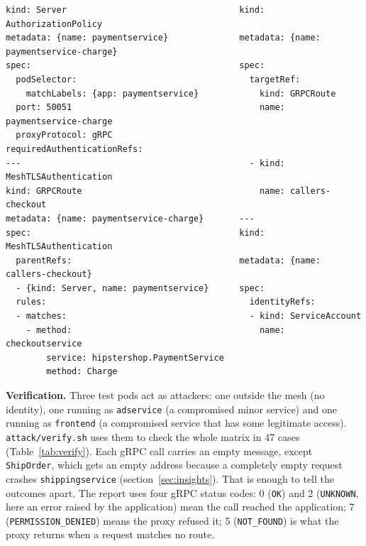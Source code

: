 \documentclass[12pt,a4paper]{article}
\begin{document}
\begin{listing}[H]
\begin{Verbatim}[fontsize=\footnotesize,frame=single,framesep=2mm]
kind: Server                                  kind: AuthorizationPolicy
metadata: {name: paymentservice}              metadata: {name: paymentservice-charge}
spec:                                         spec:
  podSelector:                                  targetRef:
    matchLabels: {app: paymentservice}            kind: GRPCRoute
  port: 50051                                     name: paymentservice-charge
  proxyProtocol: gRPC                           requiredAuthenticationRefs:
---                                             - kind: MeshTLSAuthentication
kind: GRPCRoute                                   name: callers-checkout
metadata: {name: paymentservice-charge}       ---
spec:                                         kind: MeshTLSAuthentication
  parentRefs:                                 metadata: {name: callers-checkout}
  - {kind: Server, name: paymentservice}      spec:
  rules:                                        identityRefs:
  - matches:                                    - kind: ServiceAccount
    - method:                                     name: checkoutservice
        service: hipstershop.PaymentService
        method: Charge
\end{Verbatim}
\caption{The four resources that let only \texttt{checkoutservice} call
  \texttt{PaymentService/Charge}, shortened (no \texttt{apiVersion},
  namespace or labels). The same file has a second route and policy for the
  health check. Full version: \texttt{policies/paymentservice.yaml} and
  \texttt{policies/00-authentications.yaml}.}
\label{lst:payment}
\end{listing}

\textbf{Verification.} Three test pods act as attackers: one outside the mesh
(no identity), one running as \texttt{adservice} (a compromised minor
service) and one running as \texttt{frontend} (a compromised service that has
some legitimate access). \texttt{attack/verify.sh} uses them to check the
whole matrix in 47 cases (Table~\ref{tab:verify}). Each gRPC call carries an
empty message, except \texttt{ShipOrder}, which gets an empty address because
a completely empty request crashes \texttt{shippingservice}
(section~\ref{sec:insights}). That is enough to tell the outcomes apart. The
report uses four gRPC status codes: 0 (\texttt{OK}) and 2
(\texttt{UNKNOWN}, here an error raised by the application) mean the call
reached the application; 7 (\texttt{PERMISSION\_DENIED}) means the proxy
refused it; 5 (\texttt{NOT\_FOUND}) is what the proxy returns when a request
matches no route.
\end{document}

